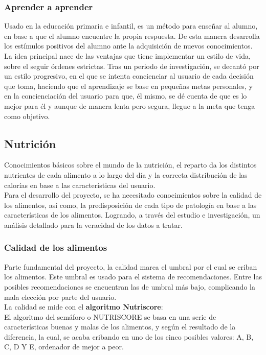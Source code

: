 \subsubsection{Aprender a aprender \cite{autoAprendizajeForma}}
Usado en la educación primaria e infantil, es un método para enseñar al alumno, en base a que el alumno encuentre la propia respuesta. De esta manera desarrolla los estímulos positivos del alumno ante la adquisición de nuevos conocimientos. \\
La idea principal nace de las ventajas que tiene implementar un estilo de vida, sobre el seguir órdenes estrictas. Tras un periodo de investigación, se decantó por un estilo progresivo, en el que se intenta concienciar al usuario de cada decisión que toma, haciendo que el aprendizaje se base en pequeñas metas personales, y en la concienciación del usuario para que, él mismo, se dé cuenta de que es lo mejor para él y aunque de manera lenta pero segura, llegue a la meta que tenga como objetivo.
\subsection{Nutrición}
Conocimientos básicos sobre el mundo de la nutrición, el reparto da los distintos nutrientes de cada alimento a lo largo del día y la correcta distribución de las calorías en base a las características del usuario.\\

Para el desarrollo del proyecto, se ha necesitado conocimientos sobre la calidad de los alimentos, así como, la predisposición de cada tipo de patología en base a las características de los alimentos. Logrando, a través del estudio e investigación, un análisis detallado para la veracidad de los datos a tratar.
\subsubsection{Calidad de los alimentos}
Parte fundamental del proyecto, la calidad marca el umbral por el cual se criban los alimentos. Este umbral es usado para el sistema de recomendaciones. Entre las posibles recomendaciones se encuentran las de umbral más bajo, complicando la mala elección por parte del usuario.\\
La calidad se mide con el \textbf{algoritmo Nutriscore}:\\
El algoritmo del semáforo o NUTRISCORE se basa en una serie de características buenas y malas de los alimentos, y según el resultado de la diferencia, la cual, se acaba cribando en uno de los cinco posibles valores: A, B, C, D Y E, ordenador de mejor a peor.\\

